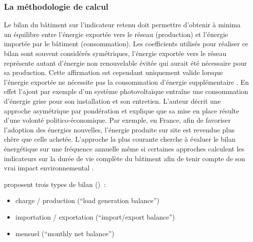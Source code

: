 \subsubsection{La méthodologie de calcul} %
\label{ssub:la_methodologie_de_calcul}
Le bilan du bâtiment sur l’indicateur retenu doit permettre d’obtenir à minima un
équilibre entre l’énergie exportée vers le réseau (production) et l’énergie importée par
le bâtiment (consommation). Les coefficients utilisés pour réaliser ce bilan sont souvent
considérés symétriques, l’énergie exportée vers le réseau représente autant d’énergie non
renouvelable évitée qui aurait été nécessaire pour sa production. Cette affirmation est
cependant uniquement valide lorsque l’énergie exportée ne nécessite pas la consommation
d’énergie supplémentaire \parencite{Sartori2012220}. En effet l’ajout par exemple d’un
système photovoltaïque entraîne une consommation d’énergie grise pour son installation et
son entretien. L’auteur décrit une approche asymétrique par pondération et explique que sa
mise en place résulte d’une volonté politico-économique. Par exemple, en France, afin de favoriser
l’adoption des énergies nouvelles, l’énergie produite sur site est revendue plus chère que
celle achetée.
L’approche la plus courante cherche à évaluer le bilan énergétique sur une fréquence annuelle
même si certaines approches calculent les indicateurs sur la durée de vie complète
du bâtiment afin de tenir compte de son vrai impact environnemental \parencite{Voss201146}.

\textcite{Sartori2012220} proposent trois types de bilan ()~:
\begin{itemize}
    \item charge / production (\enquote{load generation balance})
    \item importation / exportation (\enquote{import/export balance})
    \item mensuel (\enquote{monthly net balance})
\end{itemize}

